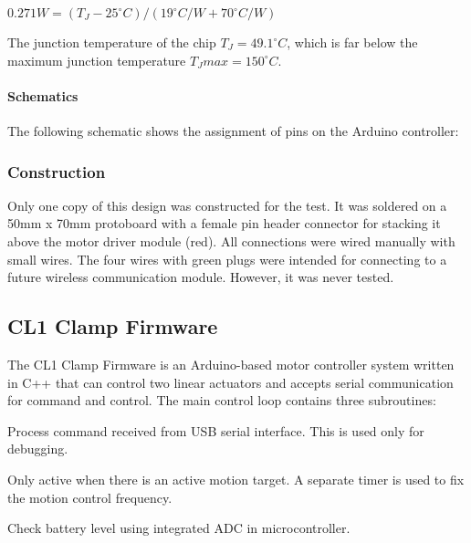 $0.271W = (T_J - 25^{\circ}C) / (19^{\circ}C/W + 70^{\circ}C/W)$

The junction temperature of the chip $T_J = 49.1^{\circ}C$, which is far below the maximum junction temperature $T_J{max} = 150^{\circ}C$.

\paragraph{Schematics}

The following schematic shows the assignment of pins on the Arduino controller:

\subsubsection{Construction}
\label{subsubsection:exploration-1-construction}

Only one copy of this design was constructed for the test. It was soldered on a 50mm x 70mm protoboard with a female pin header connector for stacking it above the motor driver module (red). All connections were wired manually with small wires. The four wires with green plugs were intended for connecting to a future wireless communication module. However, it was never tested.

\subsection{CL1 Clamp Firmware}
\label{subsection:exploration-1-cl1-firmware}

The CL1 Clamp Firmware is an Arduino-based motor controller system written in C++ that can control two linear actuators and accepts serial communication for command and control. The main control loop contains three subroutines:

\begin{description}[style=unboxed] %
    \item[Read and Process Serial Command] Process command received from USB serial interface. This is used only for debugging. 
    \item[Motor Motion Control] Only active when there is an active motion target. A separate timer is used to fix the motion control frequency. 
    \item[Battery Monitor] Check battery level using integrated ADC in microcontroller. 
\end{description}

